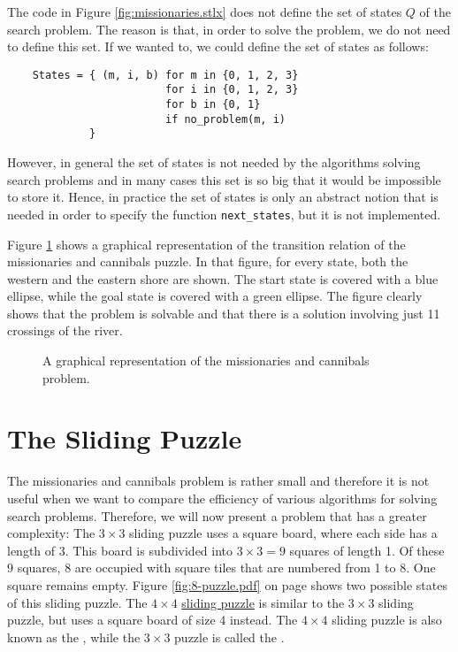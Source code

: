 The code in Figure \ref{fig:missionaries.stlx} does not define the set of states $Q$ of the search problem.  The
reason is that, in order to solve the problem, we do not need to define this set.  If we wanted to, we could
define the set of states as follows: 
\begin{verbatim}
    States = { (m, i, b) for m in {0, 1, 2, 3}
                         for i in {0, 1, 2, 3}
                         for b in {0, 1} 
                         if no_problem(m, i)
             }
\end{verbatim}
However, in general the set of states is not needed by the algorithms solving search problems and in many cases
this set is so big that it would be impossible to store it.  Hence, in practice the set of states is only an
abstract notion that is needed in order to specify the function \texttt{next\_states}, but it is not implemented.

Figure \ref{fig:missionaries.pdf} shows a graphical representation of the transition relation of the
missionaries and cannibals puzzle.  In that figure, for every state, both the western and the
eastern shore are shown.  The start state is covered with a blue ellipse, while the goal state is
covered with a green ellipse.  The figure clearly shows that the problem is solvable and that there
is a solution involving just 11 crossings of the river.
\eox

\begin{figure}[!ht]
  \centering
  \caption{A graphical representation of the missionaries and cannibals problem.}
  \label{fig:missionaries.pdf}
\end{figure}


\section{The Sliding Puzzle}
The missionaries and cannibals problem is rather small and therefore it is not useful when we want to compare
the efficiency of various algorithms for solving search problems.  Therefore, we will now present a problem
that has a greater complexity:  The $3 \times 3$ sliding puzzle uses a 
square board, where each side has a length of 3.  This board is subdivided into $3 \times 3 = 9$ squares of length 1.  Of
these 9 squares, 8 are occupied with square tiles that are numbered from 1 to 8.  One square remains
empty. Figure \ref{fig:8-puzzle.pdf} on page \pageref{fig:8-puzzle.pdf} shows two possible states of this
sliding puzzle.  The $4 \times 4$ \href{https://en.wikipedia.org/wiki/15_puzzle}{sliding puzzle}
is similar to the $3 \times 3$ sliding puzzle, but uses a square board of size 4
instead.  The $4 \times 4$ sliding puzzle is also known as the , while the $3 \times 3$ puzzle is
called the .  

